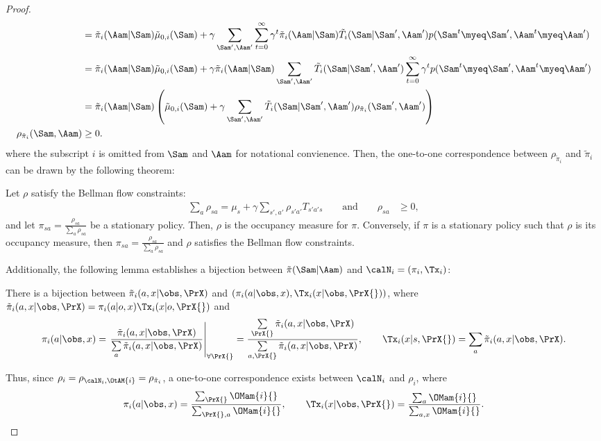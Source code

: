 \begin{proof}
\begin{align*}
    &= \tilde{\pi}_i( \Aam|\Sam) \tilde{\mu}_{0,i} (\Sam) + \gamma\sum_{\Sam', \Aam'}\sum_{t=0}^\infty \gamma^t \tilde{\pi}_i(\Aam|\Sam) \tilde{T}_i(\Sam|\Sam', \Aam') p(\Sam^t\myeq \Sam', \Aam^t\myeq \Aam') \\
    &= \tilde{\pi}_i( \Aam|\Sam) \tilde{\mu}_{0,i} (\Sam) + \gamma\tilde{\pi}_i(\Aam|\Sam) \sum_{\Sam', \Aam'} \tilde{T}_i(\Sam|\Sam', \Aam') \sum_{t=0}^\infty \gamma^tp(\Sam^t\myeq \Sam', \Aam^t\myeq \Aam') \\
    &= \tilde{\pi}_i( \Aam|\Sam) \left(\tilde{\mu}_{0,i} (\Sam) + \gamma \sum_{\Sam', \Aam'} \tilde{T}_i(\Sam|\Sam', \Aam') \rho_{\tilde{\pi}_i}(\Sam', \Aam') \right)\\
    \rho_{\tilde{\pi}_i}(\Sam, \Aam) &\geq 0.
\end{align*}
where the subscript $i$ is omitted from $\Sam$ and $\Aam$ for notational convienence. Then, the one-to-one correspondence between $\rho_{\tilde{\pi}_i}$ and $\tilde{\pi}_i$ can be drawn by the following theorem:
\begin{theorem}
    Let $\rho$ satisfy the Bellman flow constraints:
    \begin{align*}
        \sum_a \rho_{sa} = \mu_s + \gamma \sum_{s',a'}\rho_{s'a'}T_{s'a's} \qquad \text{and}\qquad \rho_{sa} &\geq 0,
    \end{align*}
    and let $\pi_{sa} = \frac{\rho_{sa}}{\sum_a\rho_{sa}}$ be a stationary policy. Then, $\rho$ is the occupancy measure for $\pi$. Conversely, if $\pi$ is a stationary policy such that $\rho$ is its occupancy measure, then $\pi_{sa} = \frac{\rho_{sa}}{\sum_a \rho_{sa}}$ and $\rho$ satisfies the Bellman flow constraints.
\end{theorem}
Additionally, the following lemma establishes a bijection between $\tilde{\pi}(\Sam|\Aam)$ and $\calN_i=(\pi_i, \Tx_i)$:
\begin{lemma}
    There is a bijection between $\pimerged$ and $(\pi_i(a|\obs, x), \Tx_i(x|\obs, \PrX{}))$, where $\pimerged =\pi_i(a|o, x)\Tx_i(x|o, \PrX{})$ and 
    \begin{align*}
    \pi_i(a|\obs, x)=\left.\frac{\pimerged}{\sum\limits_a\pimerged}\right|_{\forall \PrX{}}=\frac{\sum\limits_{\PrX{}}\pimerged}{\sum\limits_{a, \PrX{}}\pimerged}, \qquad \Tx_i(x|s, \PrX{})=\sum_a\pimerged.
    \end{align*}
\end{lemma}

Thus, since $\rho_i = \rho_{\calN_i, \OtAM{i}}=\rho_{\tilde{\pi}_i}$, a one-to-one correspondence exists between $\calN_i$ and $\rho_i$, where 
\begin{align*}
    \pi_i(a|\obs, x) = \frac{\sum_{\PrX{}} \OMam{i}{} }{\sum_{\PrX{},a} \OMam{i}{}}, \qquad \Tx_i(x|\obs, \PrX{}) = \frac{\sum_{a}\OMam{i}{}}{\sum_{a,x}\OMam{i}{}}.
\end{align*}

\end{proof}

